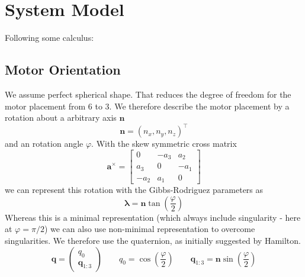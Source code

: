 \chapter{System Model}
\label{sec:sysmod}

Following some calculus:

\section{Motor Orientation}
We assume perfect spherical shape. That reduces the degree of freedom for the motor placement from 6 to 3. We therefore describe the motor placement by a rotation about a arbitrary axis $\mathbf{n}$
\begin{equation}
\mathbf{n} = \left(n_x, n_y, n_z\right)^\top
\end{equation}
and an rotation angle $\varphi$.
With the skew symmetric cross matrix
\begin{equation}
\textbf{a}^\times = \left[
\begin{array}{ccc}
0 & -a_3 & a_2 \\
a_3 & 0 & -a_1 \\
-a_2 & a_1 & 0
\end{array} \right]
\end{equation}
we can represent this rotation with the Gibbs-Rodriguez parameters as
\begin{equation}
\boldsymbol{\lambda} = \mathbf{n}\tan{\left(\frac{\varphi}{2}\right)}
\end{equation}
Whereas this is a minimal representation (which always include singularity - here at $\varphi=\pi / 2$) we can also use non-minimal representation to overcome singularities. We therefore use the quaternion, as initially suggested by Hamilton.
\begin{equation}
\mathbf{q} = \left( \begin{array}{c} 
q_0 \\ \mathbf{q}_{1:3} 
\end{array} \right) \qquad
q_0 = \cos\left(\frac{\varphi}{2}\right) \qquad
\mathbf{q}_{1:3} = \mathbf{n}\sin\left(\frac{\varphi}{2}\right)
\end{equation}

